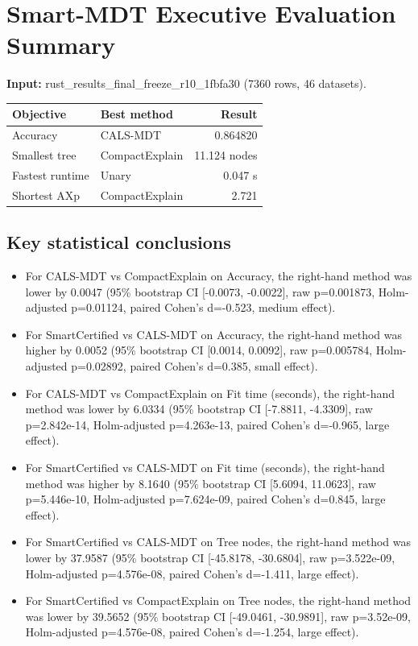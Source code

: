 \documentclass[10pt]{article}
\begin{document}
\section*{Smart-MDT Executive Evaluation Summary}
\textbf{Input:} rust\_results\_final\_freeze\_r10\_1fbfa30 (7360 rows,
46 datasets).

\begin{center}
\begin{tabular}{llr}
\toprule
Objective & Best method & Result \\
\midrule
Accuracy & CALS-MDT &
0.864820 \\
Smallest tree & CompactExplain &
11.124 nodes \\
Fastest runtime & Unary &
0.047 s \\
Shortest AXp & CompactExplain &
2.721 \\
\bottomrule
\end{tabular}
\end{center}

\subsection*{Key statistical conclusions}
\begin{itemize}

\item For CALS-MDT vs CompactExplain on Accuracy, the right-hand method was lower by 0.0047 (95\% bootstrap CI [-0.0073, -0.0022], raw p=0.001873, Holm-adjusted p=0.01124, paired Cohen's d=-0.523, medium effect).

\item For SmartCertified vs CALS-MDT on Accuracy, the right-hand method was higher by 0.0052 (95\% bootstrap CI [0.0014, 0.0092], raw p=0.005784, Holm-adjusted p=0.02892, paired Cohen's d=0.385, small effect).

\item For CALS-MDT vs CompactExplain on Fit time (seconds), the right-hand method was lower by 6.0334 (95\% bootstrap CI [-7.8811, -4.3309], raw p=2.842e-14, Holm-adjusted p=4.263e-13, paired Cohen's d=-0.965, large effect).

\item For SmartCertified vs CALS-MDT on Fit time (seconds), the right-hand method was higher by 8.1640 (95\% bootstrap CI [5.6094, 11.0623], raw p=5.446e-10, Holm-adjusted p=7.624e-09, paired Cohen's d=0.845, large effect).

\item For SmartCertified vs CALS-MDT on Tree nodes, the right-hand method was lower by 37.9587 (95\% bootstrap CI [-45.8178, -30.6804], raw p=3.522e-09, Holm-adjusted p=4.576e-08, paired Cohen's d=-1.411, large effect).

\item For SmartCertified vs CompactExplain on Tree nodes, the right-hand method was lower by 39.5652 (95\% bootstrap CI [-49.0461, -30.9891], raw p=3.52e-09, Holm-adjusted p=4.576e-08, paired Cohen's d=-1.254, large effect).

\end{itemize}
\end{document}
